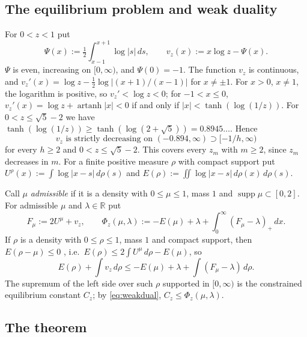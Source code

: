 \documentclass[11pt]{amsart}
\theoremstyle{definition}
\theoremstyle{remark}
\numberwithin{equation}{section}
\newcommand{\RR}{\mathbb{R}}
\newcommand{\artanh}{\operatorname{artanh}}
\begin{document}
\subsection{The equilibrium problem and weak duality}\label{sec:equil}
For $0<z<1$ put
\[
  \Psi(x):=\tfrac12\int_{x-1}^{x+1}\log|s|\,ds,\qquad v_z(x):=x\log z-\Psi(x).
\]
$\Psi$ is even, increasing on $[0,\infty)$, and $\Psi(0)=-1$. The function $v_z$ is continuous, and
$v_z'(x)=\log z-\frac12\log|(x+1)/(x-1)|$ for $x\ne\pm1$. For $x>0$, $x\ne1$, the logarithm is positive, so
$v_z'<\log z<0$; for $-1<x\le0$, $v_z'(x)=\log z+\artanh|x|<0$ if and only if $|x|<\tanh(\log(1/z))$. For
$0<z\le\sqrt5-2$ we have $\tanh(\log(1/z))\ge\tanh(\log(2+\sqrt5))=0.8945\ldots$. Hence
\begin{equation}\label{eq:vmono}
  v_z\text{ is strictly decreasing on }(-0.894,\infty)\supset[-1/h,\infty)
\end{equation}
for every $h\ge2$ and $0<z\le\sqrt5-2$.
This covers every $z_m$ with $m\ge2$, since $z_m$ decreases in $m$. For a finite positive measure $\rho$ with compact
support put $U^\rho(x):=\int\log|x-s|\,d\rho(s)$ and $E(\rho):=\iint\log|x-s|\,d\rho(x)\,d\rho(s)$.

Call $\mu$ \emph{admissible} if it is a density with $0\le\mu\le1$, mass $1$ and $\operatorname{supp}\mu\subset[0,2]$.
For admissible $\mu$ and $\lambda\in\RR$ put
\[
  F_\mu:=2U^\mu+v_z,\qquad \Phi_z(\mu,\lambda):=-E(\mu)+\lambda+\int_0^\infty(F_\mu-\lambda)_+\,dx .
\]
If $\rho$ is a density with $0\le\rho\le1$, mass $1$ and compact support, then $E(\rho-\mu)\le0$
\cite[Lemma~I.1.8]{SaffTotik}, i.e.\ $E(\rho)\le2\int U^\mu\,d\rho-E(\mu)$, so
\begin{equation}\label{eq:weakdual}
  E(\rho)+\int v_z\,d\rho\le-E(\mu)+\lambda+\int(F_\mu-\lambda)\,d\rho .
\end{equation}
The supremum of the left side over such $\rho$ supported in $[0,\infty)$ is the constrained equilibrium constant $C_z$;
by \eqref{eq:weakdual}, $C_z\le\Phi_z(\mu,\lambda)$.

\subsection{The theorem}
\end{document}
